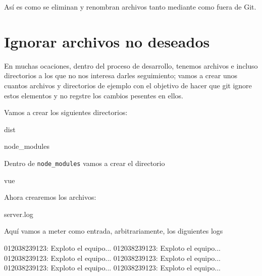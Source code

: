 \documentclass[
]{book}
\newenvironment{Shaded}{\begin{snugshade}}{\end{snugshade}}
\newcommand{\ExtensionTok}[1]{#1}
\newcommand{\NormalTok}[1]{#1}
\begin{document}
Así es como se eliminan y renombran archivos tanto mediante como fuera de Git.

\section{Ignorar archivos no deseados}\label{ignorar-archivos-no-deseados}

En muchas ocaciones, dentro del proceso de desarrollo, tenemos archivos e incluso directorios a los que no nos interesa darles seguimiento; vamos a crear unos cuantos archivos y directorios de ejemplo con el objetivo de hacer que git ignore estos elementos y no regstre los cambios pesentes en ellos.

Vamos a crear los siguientes directorios:

\begin{Shaded}
\begin{Highlighting}[]
\ExtensionTok{dist}
\end{Highlighting}
\end{Shaded}

\begin{Shaded}
\begin{Highlighting}[]
\ExtensionTok{node\_modules}
\end{Highlighting}
\end{Shaded}

Dentro de \texttt{node\_modules} vamos a crear el directorio

\begin{Shaded}
\begin{Highlighting}[]
\ExtensionTok{vue}
\end{Highlighting}
\end{Shaded}

Ahora crearemos los archivos:

\begin{Shaded}
\begin{Highlighting}[]
\ExtensionTok{server.log}
\end{Highlighting}
\end{Shaded}

Aquí vamos a meter como entrada, arbitrariamente, los diguientes logs

\begin{Shaded}
\begin{Highlighting}[]
\ExtensionTok{012038239123:}\NormalTok{ Exploto el equipo...}
\ExtensionTok{012038239123:}\NormalTok{ Exploto el equipo...}
\ExtensionTok{012038239123:}\NormalTok{ Exploto el equipo...}
\ExtensionTok{012038239123:}\NormalTok{ Exploto el equipo...}
\ExtensionTok{012038239123:}\NormalTok{ Exploto el equipo...}
\ExtensionTok{012038239123:}\NormalTok{ Exploto el equipo...}
\end{Highlighting}
\end{Shaded}
\end{document}
